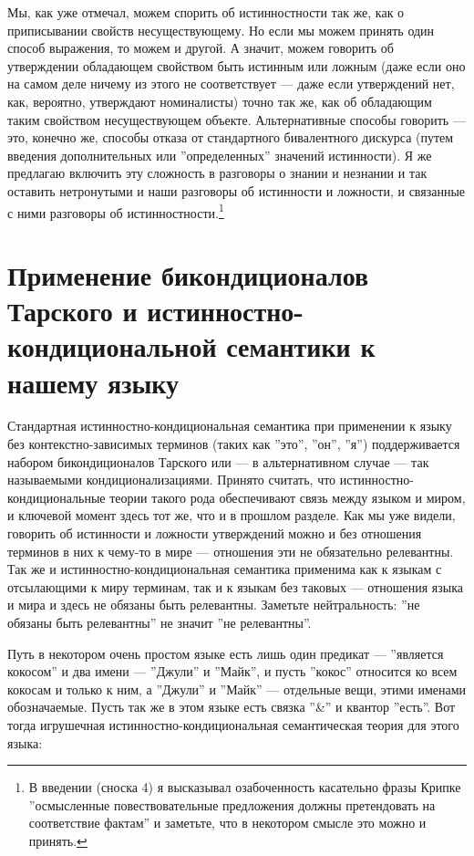 \documentclass[11pt]{book}
\begin{document}
Мы, как уже отмечал, можем спорить об истинностности так же, как о приписывании свойств несуществующему. Но если мы можем принять один способ выражения, то можем и другой. А значит, можем говорить об утверждении обладающем свойством быть истинным или ложным (даже если оно на самом деле ничему из этого не соответствует --- даже если утверждений нет, как, вероятно, утверждают номиналисты) точно так же, как об обладающим таким свойством несуществующем объекте. Альтернативные способы говорить --- это, конечно же, способы отказа от стандартного бивалентного дискурса (путем введения дополнительных или ''определенных'' значений истинности). Я же предлагаю включить эту сложность в разговоры о знании и незнании и так оставить нетронутыми и наши разговоры об истинности и ложности, и связанные с ними разговоры об истинностности.\footnote{В введении (сноска 4) я высказывал озабоченность касательно фразы Крипке ''осмысленные повествовательные предложения должны претендовать на соответствие фактам'' и заметьте, что в некотором смысле это можно и принять.}

\section{Применение бикондиционалов Тарского и истинностно-кондициональной семантики к нашему языку}

Стандартная истинностно-кондициональная семантика при применении к языку без контекстно-зависимых терминов (таких как ''это'', ''он'', ''я'') поддерживается набором бикондиционалов Тарского или --- в альтернативном случае --- так называемыми кондиционализациями. Принято считать, что истинностно-кондициональные теории такого рода обеспечивают связь между языком и миром, и ключевой момент здесь тот же, что и в прошлом разделе. Как мы уже видели, говорить об истинности и ложности утверждений можно и без отношения терминов в них к чему-то в мире --- отношения эти не обязательно релевантны. Так же и истинностно-кондициональная семантика применима как к языкам с отсылающими к миру терминам, так и к языкам без таковых --- отношения языка и мира и здесь не обязаны быть релевантны. Заметьте нейтральность: ''не обязаны быть релевантны'' не значит ''не релевантны''.

Путь в некотором очень простом языке есть лишь один предикат --- ''является кокосом'' и два имени --- ''Джули'' и ''Майк'', и пусть ''кокос'' относится ко всем кокосам и только к ним, а ''Джули'' и ''Майк'' --- отдельные вещи, этими именами обозначаемые. Пусть так же в этом языке есть связка ''\&'' и квантор ''есть''. Вот тогда игрушечная истинностно-кондициональная семантическая теория для этого языка:
\end{document}

